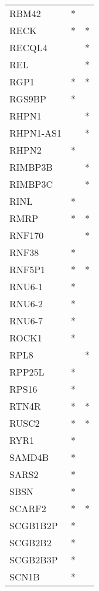 \begin{longtable}{lcc}
RBM42        &         * &         \\
RECK         &         * &       * \\
RECQL4       &           &       * \\
REL          &           &       * \\
RGP1         &         * &       * \\
RGS9BP       &         * &         \\
RHPN1        &           &       * \\
RHPN1-AS1    &           &       * \\
RHPN2        &         * &         \\
RIMBP3B      &           &       * \\
RIMBP3C      &           &       * \\
RINL         &         * &         \\
RMRP         &         * &       * \\
RNF170       &           &       * \\
RNF38        &         * &         \\
RNF5P1       &         * &       * \\
RNU6-1       &         * &         \\
RNU6-2       &         * &         \\
RNU6-7       &         * &         \\
ROCK1        &         * &         \\
RPL8         &           &       * \\
RPP25L       &         * &         \\
RPS16        &         * &         \\
RTN4R        &         * &       * \\
RUSC2        &         * &       * \\
RYR1         &         * &         \\
SAMD4B       &         * &         \\
SARS2        &         * &         \\
SBSN         &         * &         \\
SCARF2       &         * &       * \\
SCGB1B2P     &         * &         \\
SCGB2B2      &         * &         \\
SCGB2B3P     &         * &         \\
SCN1B        &         * &         \\

\end{longtable}
